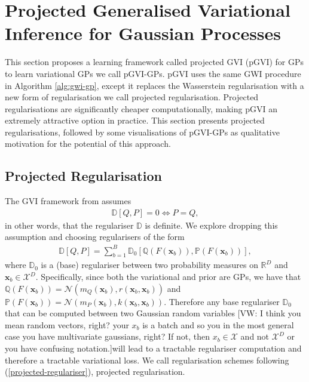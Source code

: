 \documentclass{article}
\newcommand{\vw}[1]{{\color{green} [VW: #1]}}
\newcommand{\calX}{\mathcal{X}}
\numberwithin{equation}{section}
\begin{document}
\newpage
\section{Projected Generalised Variational Inference for Gaussian Processes}
This section proposes a learning framework called projected GVI (pGVI) for GPs to learn variational GPs we call pGVI-GPs. 
pGVI uses the same GWI procedure in Algorithm \ref{alg:gwi-gp}, except it replaces the Wasserstein regularisation with a new form of regularisation we call projected regularisation. 
Projected regularisations are significantly cheaper computationally, making pGVI an extremely attractive option in practice. 
This section presents projected regularisations, followed by some visualisations of pGVI-GPs as qualitative motivation for the potential of this approach.

\subsection{Projected Regularisation}
The GVI framework from \cite{knoblauch2022optimization} assumes 
\begin{align}
    \mathbb{D}\left[Q, P\right] = 0 \Leftrightarrow P = Q,
\end{align}
in other words, that the regulariser $\mathbb{D}$ is definite.
We explore dropping this assumption and choosing regularisers of the form
\begin{align}
    \mathbb{D}\left[Q, P\right] = \sum_{{b}=1}^{B} \mathbb{D}_0 \left[\mathbb{Q}\left(F(\mathbf{x}_{b})\right), \mathbb{P}\left(F(\mathbf{x}_{b})\right)\right],
    \label{projected-regulariser}
\end{align}
where $\mathbb{D}_0$ is a (base) regulariser between two probability measures on $\mathbb{R}^D$ and $\mathbf{x}_{b} \in \mathcal{X}^D$.
Specifically, since both the variational and prior are GPs, we have that $\mathbb{Q}\left(F(\mathbf{x}_{b})\right) = \mathcal{N}\left(m_Q(\mathbf{x}_{b}), r(\mathbf{x}_{b}, \mathbf{x}_{b})\right)$ and $\mathbb{P}\left(F(\mathbf{x}_{b})\right) = \mathcal{N}\left(m_P(\mathbf{x}_{b}), k(\mathbf{x}_{b}, \mathbf{x}_{b})\right)$. 
Therefore any base regulariser $\mathbb{D}_0$ that can be computed between two Gaussian random variables \vw{I think you mean random vectors, right? your $x_b$ is a batch and so you in the most general case you have multivariate gaussians, right? If not, then $x_b \in \calX$ and not $\calX^D$ or you have confusing notation.}will lead to a tractable regulariser computation and therefore a tractable variational loss. We call regularisation schemes following (\ref{projected-regulariser}), projected regularisation.
\end{document}
